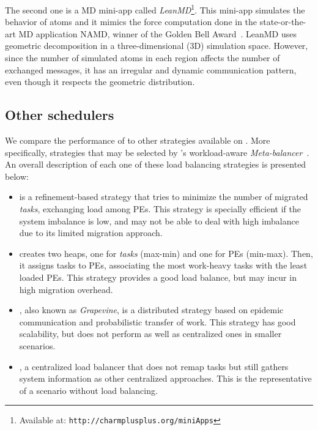 The second one is a MD mini-app called \textit{LeanMD}\footnote{Available at: \texttt{http://charmplusplus.org/miniApps}}.
This mini-app simulates the behavior of atoms and it mimics the force computation done in the state-or-the-art MD application NAMD, winner of the Golden Bell Award~\cite{grapevine}.
LeanMD uses geometric decomposition in a three-dimensional ($3$D) simulation space.
However, since the number of simulated atoms in each region affects the number of exchanged messages, it has an irregular and dynamic communication pattern, even though it respects the geometric distribution.

\subsection{Other schedulers}

We compare the performance of \packdrop to other strategies available on \charm.
More specifically, strategies that may be selected by \charm 's workload-aware \textit{Meta-balancer}~\cite{MenonPHD}.
An overall description of each one of these load balancing strategies is presented below:

\begin{itemize}
	\item {} is a refinement-based strategy that tries to minimize the number of migrated \textit{tasks}, exchanging load among PEs.
This strategy is specially efficient if the system imbalance is low, and may not be able to deal with high imbalance due to its limited migration approach.
	\item \greedylb creates two heaps, one for \textit{tasks} (max-min) and one for PEs (min-max). 
Then, it assigns tasks to PEs, associating the most work-heavy tasks with the least loaded PEs.
This strategy provides a good load balance, but may incur in high migration overhead.
    \item \distributedlb, also known as \textit{Grapevine}, is a distributed strategy based on epidemic communication and probabilistic transfer of work.
   This strategy has good scalability, but does not perform as well as centralized ones in smaller scenarios.
   \item \dummylb, a centralized load balancer that does not remap tasks but still gathers system information as other centralized approaches.
   This is the representative of a scenario without load balancing.

\end{itemize}



